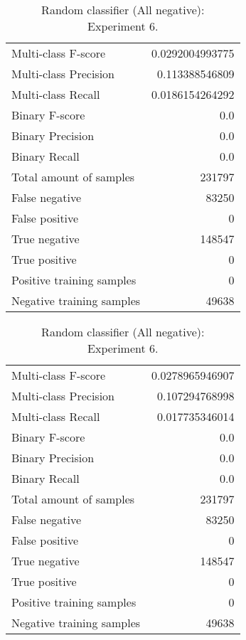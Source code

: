 \begin{table}[H]
\begin{minipage}{0.5\textwidth}
\caption{Random classifier (All negative): \\Experiment 5.}
\centering
\begin{tabular}{l r}
\toprule
Multi-class F-score & 0.0292004993775 \\
Multi-class Precision & 0.113388546809 \\
Multi-class Recall & 0.0186154264292 \\
\midrule
Binary F-score & 0.0 \\
Binary Precision & 0.0 \\
Binary Recall & 0.0 \\
\midrule
Total amount of samples & 231797 \\
False negative & 83250 \\
False positive & 0 \\
True negative & 148547 \\
True positive & 0 \\
\midrule
Positive training samples & 0 \\
Negative training samples & 49638 \\
\bottomrule
\end{tabular}
\end{minipage}
\hfillx
\begin{minipage}{0.5\textwidth}
\caption{Random classifier (All negative): \\Experiment 6.}
\centering
\begin{tabular}{l r}
\toprule
Multi-class F-score & 0.0278965946907 \\
Multi-class Precision & 0.107294768998 \\
Multi-class Recall & 0.017735346014 \\
\midrule
Binary F-score & 0.0 \\
Binary Precision & 0.0 \\
Binary Recall & 0.0 \\
\midrule
Total amount of samples & 231797 \\
False negative & 83250 \\
False positive & 0 \\
True negative & 148547 \\
True positive & 0 \\
\midrule
Positive training samples & 0 \\
Negative training samples & 49638 \\
\bottomrule
\end{tabular}
\end{minipage}
\end{table}
